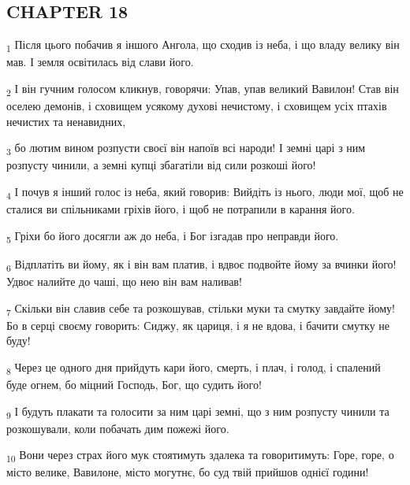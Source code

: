 \subsection{CHAPTER 18}
\begin{tcolorbox}
\textsubscript{1} Після цього побачив я іншого Ангола, що сходив із неба, і що владу велику він мав. І земля освітилась від слави його.
\end{tcolorbox}
\begin{tcolorbox}
\textsubscript{2} І він гучним голосом кликнув, говорячи: Упав, упав великий Вавилон! Став він оселею демонів, і сховищем усякому духові нечистому, і сховищем усіх птахів нечистих та ненавидних,
\end{tcolorbox}
\begin{tcolorbox}
\textsubscript{3} бо лютим вином розпусти своєї він напоїв всі народи! І земні царі з ним розпусту чинили, а земні купці збагатіли від сили розкоші його!
\end{tcolorbox}
\begin{tcolorbox}
\textsubscript{4} І почув я інший голос із неба, який говорив: Вийдіть із нього, люди мої, щоб не сталися ви спільниками гріхів його, і щоб не потрапили в карання його.
\end{tcolorbox}
\begin{tcolorbox}
\textsubscript{5} Гріхи бо його досягли аж до неба, і Бог ізгадав про неправди його.
\end{tcolorbox}
\begin{tcolorbox}
\textsubscript{6} Відплатіть ви йому, як і він вам платив, і вдвоє подвойте йому за вчинки його! Удвоє налийте до чаші, що нею він вам наливав!
\end{tcolorbox}
\begin{tcolorbox}
\textsubscript{7} Скільки він славив себе та розкошував, стільки муки та смутку завдайте йому! Бо в серці своєму говорить: Сиджу, як цариця, і я не вдова, і бачити смутку не буду!
\end{tcolorbox}
\begin{tcolorbox}
\textsubscript{8} Через це одного дня прийдуть кари його, смерть, і плач, і голод, і спалений буде огнем, бо міцний Господь, Бог, що судить його!
\end{tcolorbox}
\begin{tcolorbox}
\textsubscript{9} І будуть плакати та голосити за ним царі земні, що з ним розпусту чинили та розкошували, коли побачать дим пожежі його.
\end{tcolorbox}
\begin{tcolorbox}
\textsubscript{10} Вони через страх його мук стоятимуть здалека та говоритимуть: Горе, горе, о місто велике, Вавилоне, місто могутнє, бо суд твій прийшов однієї години!
\end{tcolorbox}
